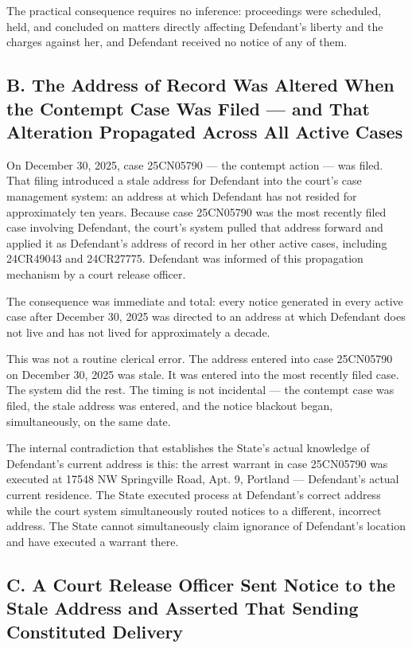\documentclass[12pt,letterpaper]{article}
\begin{document}
The practical consequence requires no inference: proceedings were scheduled, held,
and concluded on matters directly affecting Defendant's liberty and the charges
against her, and Defendant received no notice of any of them.

\subsection*{B. The Address of Record Was Altered When the Contempt Case Was
Filed --- and That Alteration Propagated Across All Active Cases}

On December 30, 2025, case 25CN05790 --- the contempt action --- was filed. That
filing introduced a stale address for Defendant into the court's case management
system: an address at which Defendant has not resided for approximately ten years.
Because case 25CN05790 was the most recently filed case involving Defendant, the
court's system pulled that address forward and applied it as Defendant's address
of record in her other active cases, including 24CR49043 and 24CR27775. Defendant
was informed of this propagation mechanism by a court release officer.

The consequence was immediate and total: every notice generated in every active
case after December 30, 2025 was directed to an address at which Defendant does
not live and has not lived for approximately a decade.

This was not a routine clerical error. The address entered into case 25CN05790 on
December 30, 2025 was stale. It was entered into the most recently filed case.
The system did the rest. The timing is not incidental --- the contempt case was
filed, the stale address was entered, and the notice blackout began,
simultaneously, on the same date.

The internal contradiction that establishes the State's actual knowledge of
Defendant's current address is this: the arrest warrant in case 25CN05790 was
executed at 17548 NW Springville Road, Apt. 9, Portland --- Defendant's actual
current residence. The State executed process at Defendant's correct address
while the court system simultaneously routed notices to a different, incorrect
address. The State cannot simultaneously claim ignorance of Defendant's location
and have executed a warrant there.

\subsection*{C. A Court Release Officer Sent Notice to the Stale Address and
Asserted That Sending Constituted Delivery}
\end{document}
